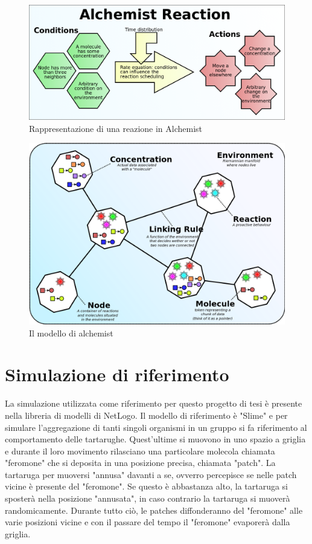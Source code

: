 \documentclass[12pt,a4paper,openright,twoside]{book}
\begin{document}
\begin{figure}[ht]
    \centering
    \includegraphics[width=.8\linewidth]{figures/alchemistReaction.png}
    \caption{Rappresentazione di una reazione in Alchemist}
    \label{fig:reactionAlchemist}
\end{figure}
\begin{figure}[ht]
    \centering
    \includegraphics[width=.8\linewidth]{figures/alchemistModel.png}
    \caption{Il modello di alchemist}
    \label{fig:rmodelAlchemist}
\end{figure}
\clearpage

\section{Simulazione di riferimento}\label{refSim}
La simulazione utilizzata come riferimento per questo progetto di tesi è presente nella libreria
di modelli di NetLogo\cite{wilensky1997netlogo}. Il modello di riferimento è "Slime"\cite{wilensky1997netlogo}
e per simulare l'aggregazione di tanti singoli organismi in un gruppo si fa riferimento al comportamento delle tartarughe.
Quest'ultime si muovono in uno spazio a griglia e durante il loro movimento rilasciano una particolare molecola
chiamata "feromone" che si deposita in una posizione precisa, chiamata "patch". La tartaruga per muoversi 
"annusa" davanti a se, ovverro percepisce se nelle patch vicine è presente del "feromone". Se questo è abbastanza alto, la 
tartaruga si sposterà nella posizione "annusata", in caso contrario la tartaruga si muoverà randomicamente. 
Durante tutto ciò, le patches diffonderanno del "feromone" alle varie posizioni vicine e con il passare del tempo 
il "feromone" evaporerà dalla griglia.
\end{document}
